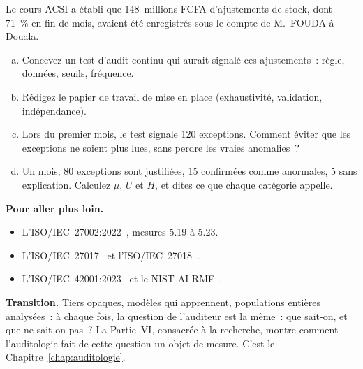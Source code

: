 \begin{boxexo}[title={\ding{45}\quad Exercice~15.4. Un audit continu des ajustements de stock \niveauexpert}]
Le cours ACSI a établi que 148~millions FCFA d'ajustements de stock, dont
71~\% en fin de mois, avaient été enregistrés sous le compte de M.~FOUDA à
Douala.
\begin{enumerate}[(a)]
    \item Concevez un test d'audit continu qui aurait signalé ces
          ajustements~: règle, données, seuils, fréquence.
    \item Rédigez le papier de travail de mise en place (exhaustivité,
          validation, indépendance).
    \item Lors du premier mois, le test signale 120 exceptions. Comment
          éviter que les exceptions ne soient plus lues, sans perdre les
          vraies anomalies~?
    \item Un mois, 80 exceptions sont justifiées, 15 confirmées comme
          anormales, 5 sans explication. Calculez $\mu$, $U$ et $H$, et dites
          ce que chaque catégorie appelle.
\end{enumerate}
\end{boxexo}

\bigskip

\begin{boxinfo}
\textbf{Pour aller plus loin.}
\begin{itemize}
    \item L'ISO/IEC~27002:2022~\cite{iso27002_2022}, mesures 5.19 à 5.23.
    \item L'ISO/IEC~27017~\cite{iso27017_2015} et l'ISO/IEC~27018~\cite{iso27018_2019}.
    \item L'ISO/IEC~42001:2023~\cite{iso42001_2023} et le NIST AI
          RMF~\cite{nist2023airmf}.
\end{itemize}
\end{boxinfo}

\begin{boxinfo}
\textbf{Transition.} Tiers opaques, modèles qui apprennent, populations
entières analysées~: à chaque fois, la question de l'auditeur est la même~:
que sait-on, et que ne sait-on pas~? La Partie~VI, consacrée à la
recherche, montre comment l'auditologie fait de cette question un objet de
mesure. C'est le Chapitre~\ref{chap:auditologie}.
\end{boxinfo}
